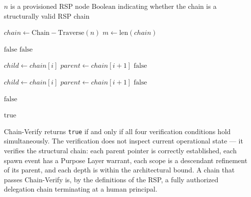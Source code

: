 \begin{algorithm}
\caption{Chain-Verify($n$) --- Verify the authorization chain from node $n$ to human anchor}
\label{alg:chain-verify}
\begin{algorithmic}[1]
\REQUIRE $n$ is a provisioned RSP node
\ENSURE $\mathrm{Boolean}$ indicating whether the chain is a structurally valid RSP chain

\STATE $chain \leftarrow \mathrm{Chain-Traverse}(n)$
\STATE $m \leftarrow \mathrm{len}(chain)$

\STATE {}
    \STATE \RETURN $\mathrm{false}$ 
\ENDIF
{}
    \STATE \RETURN $\mathrm{false}$ 
\ENDIF

\STATE {}
    \STATE $child \leftarrow chain[i]$
    \STATE $parent \leftarrow chain[i+1]$
        \STATE \RETURN $\mathrm{false}$ 
    \ENDIF
\ENDFOR

\STATE {}
    \STATE $child \leftarrow chain[i]$
    \STATE $parent \leftarrow chain[i+1]$
        \STATE \RETURN $\mathrm{false}$ 
    \ENDIF
\ENDFOR

\STATE {}
        \STATE \RETURN $\mathrm{false}$ 
    \ENDIF
\ENDFOR

\RETURN $\mathrm{true}$
\end{algorithmic}
\end{algorithm}

Chain-Verify returns \texttt{true} if and only if all four verification conditions hold simultaneously. The verification does not inspect current operational state --- it verifies the structural chain: each parent pointer is correctly established, each spawn event has a Purpose Layer warrant, each scope is a descendant refinement of its parent, and each depth is within the architectural bound. A chain that passes Chain-Verify is, by the definitions of the RSP, a fully authorized delegation chain terminating at a human principal.


